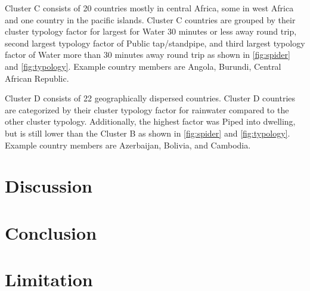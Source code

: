 \documentclass[10pt,twoside]{article}
\numberwithin{equation}{section}
\newcommand{\?}{\stackrel{?}{=}}
\begin{document}
Cluster C consists of 20 countries mostly in central Africa, some in west Africa and one country in the pacific islands. Cluster C countries are grouped by their cluster typology factor for largest for Water 30 minutes or less away round trip, second largest typology factor of Public tap/standpipe, and third largest typology factor of Water more than 30 minutes away round trip as shown in \autoref{fig:spider} and \autoref{fig:typology}. Example country members are Angola, Burundi, Central African Republic. 

Cluster D consists of 22 geographically dispersed countries. Cluster D countries are categorized by their cluster typology factor for rainwater compared to the other cluster typology. Additionally, the highest factor was Piped into dwelling, but is still lower than the Cluster B as shown in \autoref{fig:spider} and \autoref{fig:typology}. Example country members are Azerbaijan, Bolivia, and Cambodia.  



\section{Discussion}

\section{Conclusion}

\section{Limitation}

\printbibliography
\end{document}
